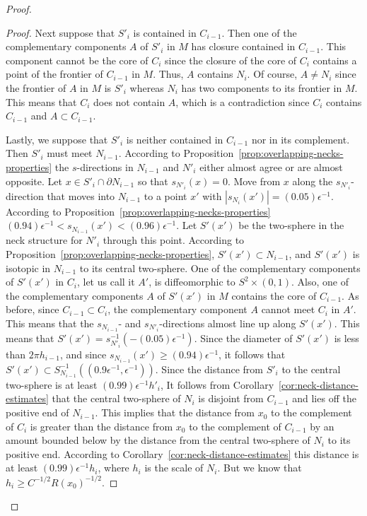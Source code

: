 \begin{proof}
\begin{proof}
Next suppose that $S'_i$ is contained in $C_{i-1}$. Then one of the
complementary components $A$ of $S'_i$ in $M$ has closure contained
in $C_{i-1}$. This component cannot be the core of $C_i$ since the
closure of the core of $C_i$ contains a point of the frontier of
$C_{i-1}$ in $M$. Thus, $A$ contains $N_i$. Of course, $A\not= N_i$
since the frontier of $A$ in $M$ is $S'_i$ whereas $N_i$ has two
components to its frontier in $M$. This means that $C_i$ does not
contain $A$, which is a contradiction since $C_i$ contains $C_{i-1}$
and $A\subset C_{i-1}$.

Lastly, we suppose that $S'_i$ is neither contained in $C_{i-1}$ nor
in its complement. Then $S'_i$ must meet $N_{i-1}$.  According to
Proposition~\ref{prop:overlapping-necks-properties} the $s$-directions in $N_{i-1}$ and
$N'_i$ either almost agree or are almost opposite. Let $x\in
S'_i\cap \partial N_{i-1}$ so that $s_{N'_i}(x)=0$. Move from $x$
along the $s_{N'_i}$-direction that moves into $N_{i-1}$ to a point
$x'$ with $|s_{N_i}(x')|=(0.05)\epsilon^{-1}$. According to
Proposition~\ref{prop:overlapping-necks-properties}
$(0.94)\epsilon^{-1}<s_{N_{i-1}}(x')<(0.96)\epsilon^{-1}$.
 Let $S'(x')$ be the two-sphere in the neck structure for $N'_i$
 through this point. According to Proposition~\ref{prop:overlapping-necks-properties},
 $S'(x')\subset N_{i-1}$, and $S'(x')$ is isotopic in $N_{i-1}$ to its
 central two-sphere. One of the complementary components of $S'(x')$
 in $C_i$, let us call it $A'$, is diffeomorphic to $S^2\times (0,1)$. Also, one of the
 complementary components $A$ of $S'(x')$ in $M$ contains the core of
 $C_{i-1}$. As before, since $C_{i-1}\subset C_i$, the complementary
 component $A$ cannot meet $C_i$ in $A'$. This means that
 the $s_{N_{i-1}}$- and $s_{N'_i}$-directions almost line up along
 $S'(x')$. This means that
 $S'(x')=s_{N'_i}^{-1}(-(0.05)\epsilon^{-1})$. Since the diameter of
 $S'(x')$ is less than $2\pi h_{i-1}$, and since
  $s_{N_{i-1}}(x')\ge (0.94)\epsilon^{-1}$, it follows
 that $S'(x')\subset
 S_{N_{i-1}}^{-1}((0.9\epsilon^{-1},\epsilon^{-1}))$.
Since the distance from $S'_i$ to the central two-sphere is at least
$(0.99)\epsilon^{-1}h'_i$,  It follows from Corollary~\ref{cor:neck-distance-estimates}
that the central two-sphere of $N_i$ is disjoint from $C_{i-1}$ and
lies off the positive end of $N_{i-1}$. This implies that the
distance from $x_0$ to the complement of $C_i$ is greater than the
distance from $x_0$ to the complement of $C_{i-1}$ by an amount
bounded below by the distance from the central two-sphere of $N_i$
to its positive end. According to Corollary~\ref{cor:neck-distance-estimates} this
distance is at least $(0.99)\epsilon^{-1}h_i$, where $h_i$ is the
scale of $N_i$. But we know that  $h_i\ge C^{-1/2}R(x_0)^{-1/2}$.


\end{proof}
\end{proof}
